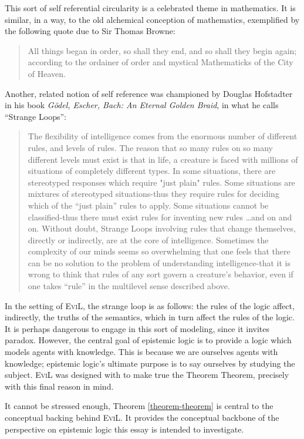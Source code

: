 This sort of self referential circularity is a celebrated theme in
mathematics. It is similar, in a way, to the old alchemical conception
of mathematics, exemplified by the following quote 
due to Sir Thomas Browne:
\begin{quote}
All things began in order, so shall they end, and so shall they begin
again; according to the ordainer of order and mystical Mathematicks of
the City of Heaven.\citet[chapter 5]{browne_garden_1736}\end{quote}
Another, related notion of self reference was championed by Douglas
Hofstadter in his book \emph{G\"odel, Escher, Bach: An Eternal Golden
  Braid}, in what he calls ``Strange Loops'':
\begin{quote}
The flexibility of intelligence comes from the enormous number of
different rules, and levels of rules. The reason that so many rules on
so many different levels must exist is that in life, a creature is
faced with millions of situations of completely different types. In
some situations, there are stereotyped responses which require "just
plain" rules. Some situations are mixtures of stereotyped
situations-thus they require rules for deciding which of the ``just
plain'' rules to apply. Some situations cannot be classified-thus
there must exist rules for inventing new rules \ldots and on and
on. Without doubt, Strange Loops involving rules that change
themselves, directly or indirectly, are at the core of
intelligence. Sometimes the complexity of our minds seems so
overwhelming that one feels that there can be no solution to the
problem of understanding intelligence-that it is wrong to think that rules of any sort govern a creature's behavior, even if one takes ``rule''
in the multilevel sense described above. \cite[pg. 24]{hofstadter_godel_1979}
\end{quote}
In the setting of \textsc{EviL}, the strange loop is as follows: the
rules of the logic affect, indirectly, the truths of the semantics,
which in turn affect the rules of the logic.  It is perhaps dangerous
to engage in this sort of modeling, since it invites paradox.
However, the central goal of epistemic logic is to
provide a logic which models agents with knowledge.  This is because we are
ourselves agents with knowledge; epistemic logic's ultimate purpose is
to say ourselves by studying the subject.  \textsc{EviL} was designed
with to make true the Theorem Theorem, precisely with this final
reason in mind.

It cannot be stressed enough, Theorem \ref{theorem-theorem} is central
to the conceptual backing behind \textsc{EviL}.  
It provides the conceptual backbone of the perspective on 
epistemic logic this essay is intended to investigate.

